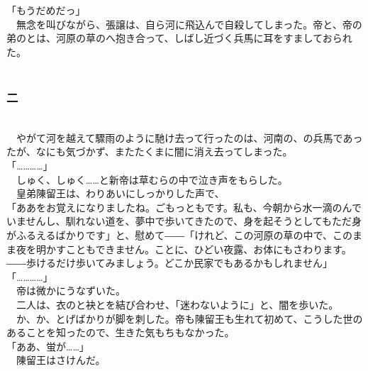 \documentclass[
  paper=a5,
  fontsize=10pt,
  jafontsize=9.5pt,
  tate,                  %
  open_bracket_pos=nibu, %
]{jlreq}
\begin{document}
「もうだめだっ」\\


　無念を叫びながら、張譲は、自ら河に飛込んで自殺してしまった。帝と、帝の弟のとは、河原の草のへ抱き合って、しばし近づく兵馬に耳をすましておられた。\\

\\

\subsubsection{二}

\\


　やがて河を越えて驟雨のように馳け去って行ったのは、河南の、の兵馬であったが、なにも気づかず、またたくまに闇に消え去ってしまった。\\


「…………」\\


　しゅく、しゅく……と新帝は草むらの中で泣き声をもらした。\\


　皇弟陳留王は、わりあいにしっかりした声で、\\


「ああをお覚えになりましたね。ごもっともです。私も、今朝から水一滴のんでいませんし、馴れない道を、夢中で歩いてきたので、身を起そうとしてもただ身がふるえるばかりです」と、慰めて――「けれど、この河原の草の中で、このまま夜を明かすこともできません。ことに、ひどい夜露、お体にもさわります。――歩けるだけ歩いてみましょう。どこか民家でもあるかもしれません」\\


「…………」\\


　帝は微かにうなずいた。\\


　二人は、衣のと袂とを結び合わせ、「迷わないように」と、闇を歩いた。\\


　か、か、とげばかりが脚を刺した。帝も陳留王も生れて初めて、こうした世のあることを知ったので、生きた気もちもなかった。\\


「ああ、蛍が……」\\


　陳留王はさけんだ。\\
\end{document}
